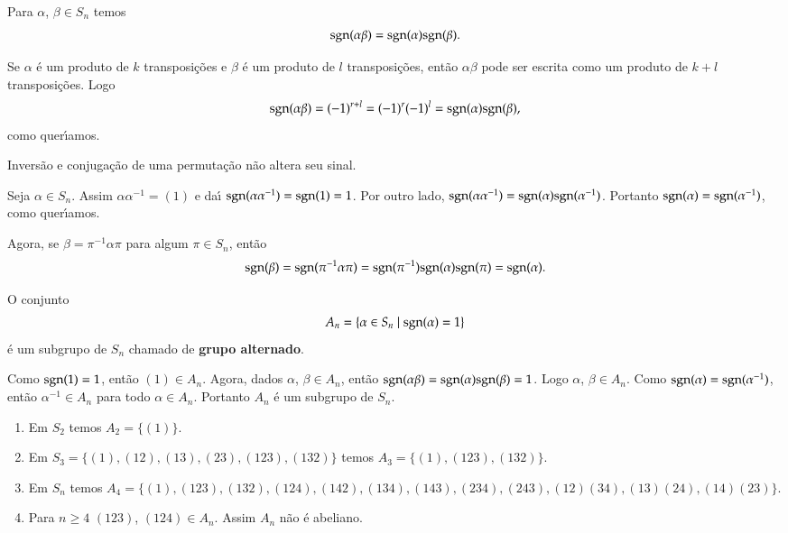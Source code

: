 \begin{proposicao}
	Para $\alpha$, $\beta \in S_n$ temos
	\[
		{\rm sgn}(\alpha\beta) = {\rm sgn}(\alpha){\rm sgn}(\beta).
	\]
\end{proposicao}
\begin{prova}
	Se $\alpha$ \'e um produto de $k$ transposi\c{c}\~oes e $\beta$ \'e um produto de $l$ transposi\c{c}\~oes, ent\~ao $\alpha\beta$ pode ser escrita como um produto de $k + l$ transposi\c{c}\~oes. Logo
	\[
		{\rm sgn}(\alpha\beta) = (-1)^{r + l} = (-1)^r(-1)^l = {\rm sgn}(\alpha){\rm sgn}(\beta),
	\]
	como quer{\'\i}amos.
\end{prova}

\begin{corolario}
	Invers\~ao e conjuga\c{c}\~ao de uma permuta\c{c}\~ao n\~ao altera seu sinal.
\end{corolario}
\begin{prova}
	Seja $\alpha \in S_n$. Assim $\alpha\alpha^{-1} = (1)$ e da{\'\i} ${\rm sgn}(\alpha\alpha^{-1}) = {\rm sgn}(1) = 1$. Por outro lado, ${\rm sgn}(\alpha\alpha^{-1}) = {\rm sgn}(\alpha){\rm sgn}(\alpha^{-1})$. Portanto ${\rm sgn}(\alpha) = {\rm sgn}(\alpha^{-1})$, como quer{\'\i}amos.
	
	Agora, se $\beta = \pi^{-1}\alpha\pi$ para algum $\pi \in S_n$, ent\~ao
	\[
		{\rm sgn}(\beta) = {\rm sgn}(\pi^{-1}\alpha\pi) = {\rm sgn}(\pi^{-1}){\rm sgn}(\alpha){\rm sgn}(\pi) = {\rm sgn}(\alpha).
	\]
\end{prova}

\begin{corolario}
	O conjunto
	\[
		A_n = \{\alpha \in S_n \mid {\rm sgn}(\alpha) = 1\}
	\]
	\'e um subgrupo de $S_n$ chamado de \textbf{grupo alternado}.
\end{corolario}
\begin{prova}
	Como ${\rm sgn}(1) = 1$, ent\~ao $(1) \in A_n$. Agora, dados $\alpha$, $\beta \in A_n$, ent\~ao ${\rm sgn}(\alpha\beta) = {\rm sgn}(\alpha){\rm sgn}(\beta) = 1$. Logo $\alpha$, $\beta \in A_n$. Como ${\rm sgn}(\alpha) = {\rm sgn}(\alpha^{-1})$, ent\~ao $\alpha^{-1} \in A_n$ para todo $\alpha \in A_n$. Portanto $A_n$ \'e um subgrupo de $S_n$.
\end{prova}

\begin{exemplos}
	\begin{enumerate}[label=({\arabic*})]
		\item Em $S_2$ temos $A_2 = \{(1)\}$.

		\item Em $S_3 = \{(1), (12), (13), (23), (123), (132)\}$ temos $A_3 = \{(1), (123), (132)\}$.

		\item Em $S_n$ temos $A_4 = \{(1), (123), (132), (124), (142), (134), (143), (234), (243), (12)(34), (13)(24), (14)(23)\}$.

		\item Para $n \ge 4$ $(123)$, $(124) \in A_n$. Assim $A_n$ n\~ao \'e abeliano.
	\end{enumerate}
\end{exemplos}

